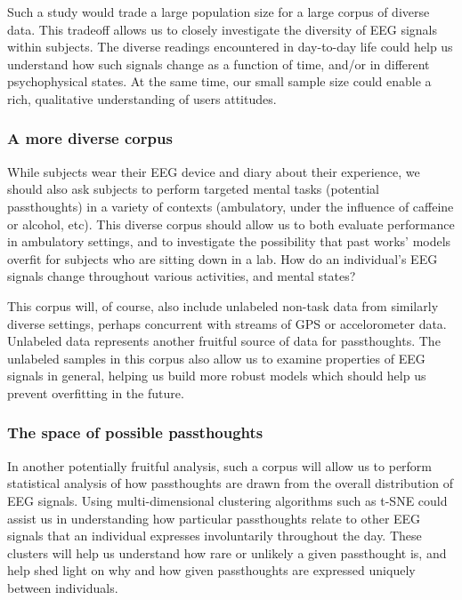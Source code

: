 \documentclass[sigconf]{acmart}
\begin{document}
Such a study would trade a large population size for a large corpus of diverse data.
This tradeoff allows us to closely investigate the diversity of EEG signals within subjects.
The diverse readings encountered in day-to-day life could help us understand how such signals change as a function of time, and/or in different psychophysical states.
At the same time, our small sample size could enable a rich, qualitative understanding of users attitudes.

\subsubsection{A more diverse corpus}
\label{sec:org9129123}

While subjects wear their EEG device and diary about their experience, we should also ask subjects to perform
targeted mental tasks (potential passthoughts) in a variety of contexts (ambulatory, under the influence of caffeine or alcohol, etc). 
This diverse corpus should allow us to both evaluate performance in ambulatory settings, and to
investigate the possibility that past works' models overfit for subjects who are sitting down in a lab.
How do an individual's EEG signals change throughout various activities, and mental states?

This corpus will, of course, also include unlabeled non-task data from similarly diverse settings, perhaps concurrent with streams of GPS or accelorometer data.
Unlabeled data represents another fruitful source of data for passthoughts.
The unlabeled samples in this corpus also allow us to examine properties of EEG signals in general, helping us build more robust models which should help us prevent overfitting in the future.

\subsubsection{The space of possible passthoughts}
\label{sec:org838cb18}
In another potentially fruitful analysis, such a corpus will allow us to perform statistical analysis of how passthoughts are drawn from the overall distribution of EEG signals. 
Using multi-dimensional clustering algorithms such as t-SNE \cite{VanDerMaaten2008} 
could assist us in understanding how particular passthoughts relate to other EEG signals that an individual expresses involuntarily throughout the day. 
These clusters will help us understand how rare or unlikely a given passthought is, and help shed light on why and how given passthoughts are expressed uniquely between individuals.
\end{document}
